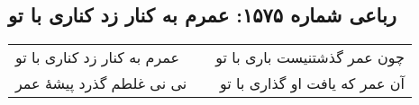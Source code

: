 \begin{center}
\section*{رباعی شماره ۱۵۷۵: عمرم به کنار زد کناری با تو}
\label{sec:1575}
\begin{longtable}{l p{0.5cm} r}
عمرم به کنار زد کناری با تو
&&
چون عمر گذشتنیست باری با تو
\\
نی نی غلطم گذرد پیشهٔ عمر
&&
آن عمر که یافت او گذاری با تو
\\
\end{longtable}
\end{center}
